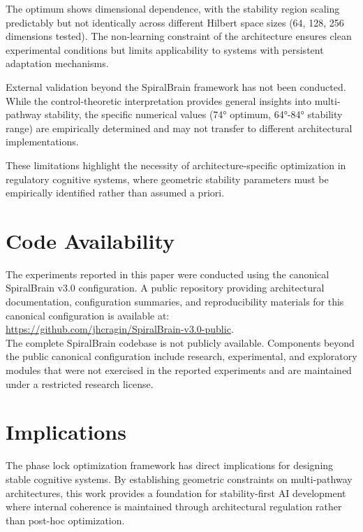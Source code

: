 \documentclass[12pt,a4paper]{article}
\begin{document}
The optimum shows dimensional dependence, with the stability region scaling predictably but not identically across different Hilbert space sizes (64, 128, 256 dimensions tested). The non-learning constraint of the architecture ensures clean experimental conditions but limits applicability to systems with persistent adaptation mechanisms.

External validation beyond the SpiralBrain framework has not been conducted. While the control-theoretic interpretation provides general insights into multi-pathway stability, the specific numerical values (74° optimum, 64°-84° stability range) are empirically determined and may not transfer to different architectural implementations.

These limitations highlight the necessity of architecture-specific optimization in regulatory cognitive systems, where geometric stability parameters must be empirically identified rather than assumed a priori.

\section{Code Availability}

The experiments reported in this paper were conducted using the canonical SpiralBrain v3.0 configuration.
A public repository providing architectural documentation, configuration summaries, and reproducibility materials for this canonical configuration is available at: \\
\url{https://github.com/jhcragin/SpiralBrain-v3.0-public}. \\

The complete SpiralBrain codebase is not publicly available. Components beyond the public canonical configuration include research, experimental, and exploratory modules that were not exercised in the reported experiments and are maintained under a restricted research license.

\section{Implications}

The phase lock optimization framework has direct implications for designing stable cognitive systems. By establishing geometric constraints on multi-pathway architectures, this work provides a foundation for stability-first AI development where internal coherence is maintained through architectural regulation rather than post-hoc optimization.
\end{document}
